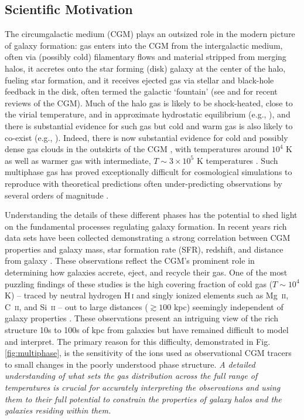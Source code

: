 \documentclass[11pt,letterpaper,english]{article}
\begin{document}
\vspace{-.25in}
\subsection{Scientific Motivation}
\vspace{-.2in}

The circumgalactic medium (CGM) plays an outsized role in the modern picture of galaxy formation: gas enters into the CGM from the intergalactic medium, often via (possibly cold) filamentary flows and material stripped from merging halos, it accretes onto the star forming (disk) galaxy at the center of the halo, fueling star formation, and it receives ejected gas via stellar and black-hole feedback in the disk, often termed the galactic `fountain' (see \cite{Tumlinson17} and \cite{Putman12} for recent reviews of the CGM).  Much of the halo gas is likely to be shock-heated, close to the virial temperature, and in approximate hydrostatic equilibrium (e.g., \cite{White78, Fielding17}), and there is substantial evidence for such gas \cite{Bregman07} but cold and warm gas is also likely to co-exist (e.g., \cite{Keres09, Wakker2009, Rigby02}).  Indeed, there is now substantial evidence for cold and possibly dense gas clouds in the outskirts of the CGM \cite{Tumlinson13, Werk14, Lau16}, with temperatures around $10^4$ K as well as warmer gas with intermediate, $T \sim 3 \times 10^5$ K temperatures \cite{Chen2009, Prochaska2011}.  Such multiphase gas has proved exceptionally difficult for cosmological simulations to reproduce with theoretical predictions often under-predicting observations by several orders of magnitude \cite{Hummels2013}.  

Understanding the details of these different phases has the potential to shed light on the fundamental processes regulating galaxy formation. In recent years rich data sets have been collected demonstrating a strong correlation between CGM properties and galaxy mass, star formation rate (SFR), redshift, and distance from galaxy \cite{Tumlinson+11, Bordoloi+14, Borthakur+15}. These observations reflect the CGM's prominent role in determining how galaxies accrete, eject, and recycle their gas. One of the most puzzling findings of these studies is the high covering fraction of cold gas ($T\sim10^4$ K) -- traced by neutral hydrogen H\,\textsc{i} and singly ionized elements such as Mg\ \textsc{ii}, C\ \textsc{ii}, and Si\ \textsc{ii} -- out to large distances ($\gtrsim 100$ kpc) seemingly independent of galaxy properties \cite{Thom12}. These observations present an intriguing view of the rich structure 10s to 100s of kpc from galaxies but have remained difficult to model and interpret. 
The primary reason for this difficulty, demonstrated in Fig.\,\ref{fig:multiphase}, 
is the sensitivity of the ions used as observational CGM tracers to small changes in the poorly understood phase structure. 
\textit{A detailed understanding of what sets the gas distribution across the full range of temperatures is crucial for accurately interpreting the observations and using them to their full potential to constrain the properties of galaxy halos and the galaxies residing within them.}
\end{document}
